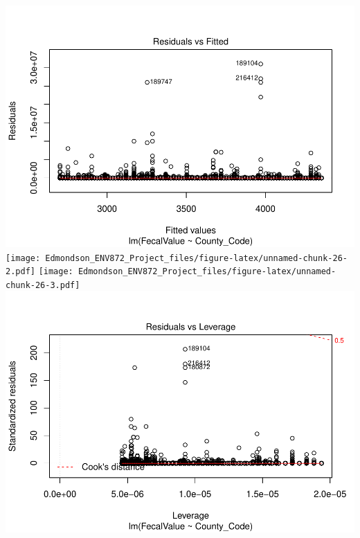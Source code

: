 \documentclass[12pt,]{article}
\begin{document}
\includegraphics{Edmondson_ENV872_Project_files/figure-latex/unnamed-chunk-26-1.pdf}
\texttt{[image: Edmondson\_ENV872\_Project\_files/figure-latex/unnamed-chunk-26-2.pdf]}
\texttt{[image: Edmondson\_ENV872\_Project\_files/figure-latex/unnamed-chunk-26-3.pdf]}
\includegraphics{Edmondson_ENV872_Project_files/figure-latex/unnamed-chunk-26-4.pdf}
\end{document}
